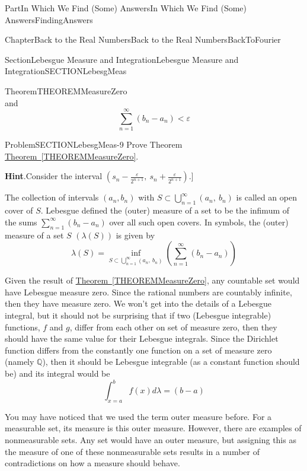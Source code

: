 \documentclass[oneside,10pt,]{book}
\newcommand{\blocktitlefont}{\relax}
\newcommand{\xreffont}{\relax}
\numberwithin{equation}{part}
\newcommand{\eps}{\varepsilon}
\newcommand{\lt}{<}
\begin{document}
\begin{partptx}{Part}{In Which We Find (Some) Answers}{}{In Which We Find (Some) Answers}{}{}{FindingAnswers}
\begin{chapterptx}{Chapter}{Back to the Real Numbers}{}{Back to the Real Numbers}{}{}{BackToFourier}
\begin{sectionptx}{Section}{Lebesgue Measure and Integration}{}{Lebesgue Measure and Integration}{}{}{SECTIONLebesgMeas}
\begin{theorem}{Theorem}{}{}{THEOREMMeasureZero}
\begin{equation*}
\end{equation*}
and%
\begin{equation*}
\sum^{\infty }_{n=1}{\left(b_n-a_n\right)}\lt\eps 
\end{equation*}
%
\end{theorem}
\begin{problem}{Problem}{}{SECTIONLebesgMeas-9}%
Prove Theorem \hyperref[THEOREMMeasureZero]{Theorem~{\xreffont\ref{THEOREMMeasureZero}}}.%
\par\smallskip%
\noindent\textbf{\blocktitlefont Hint}.\hypertarget{SECTIONLebesgMeas-9-2}{}\quad{}Consider the interval \(\left(s_n-\frac{\eps  }{2^{n+1}},\ s_n+\frac{\eps }{2^{n+1}}\right)\).]%
\end{problem}
The collection of intervals \((a_n,b_n)\) with \(S\subset
\bigcup^{\infty }_{n=1}{\left(a_n,\ b_n\right)}\) is called an open cover of \(S\).  Lebesgue defined the (outer) measure of a set to be the infimum of the sums \(\sum^{\infty
}_{n=1}{\left(b_n-a_n\right)}\) over all such open covers. In symbols, the (outer) measure of a set \(S\) \(\left(\lambda \left(S\right)\right)\) is given by%
\begin{equation*}
\lambda(S)=\inf_{S\subset \bigcup^{\infty}_{n=1}{(a_n,\ b_n)}} \left(\sum^{\infty }_{n=1}{\left(b_n-a_n\right)}\right) 
\end{equation*}
%
\par
Given the result of \hyperref[THEOREMMeasureZero]{Theorem~{\xreffont\ref{THEOREMMeasureZero}}}, any countable set would have Lebesgue measure zero.  Since the rational numbers are countably infinite, then they have measure zero.  We won't get into the details of a Lebesgue integral, but it should not be surprising that if two (Lebesgue integrable) functions, \(f\) and \(g\), differ from each other on set of measure zero, then they should have the same value for their Lebesgue integrals.  Since the Dirichlet function differs from the constantly one function on a set of measure zero (namely \(\mathbb{Q}\)), then it should be Lebesgue integrable (as a constant function should be) and its integral would be%
\begin{equation*}
\int^b_{x=a}{f\left(x\right)d\lambda =\left(b-a\right)}
\end{equation*}
%
\par
You may have noticed that we used the term outer measure before. For a measurable set, its measure is this outer measure.  However, there are examples of non\textendash{}measurable sets.  Any set would have an outer measure, but assigning this as the measure of one of these non\textendash{}measurable sets results in a number of contradictions on how a measure should behave.%

\end{sectionptx}
\end{chapterptx}
\end{partptx}
\end{document}
